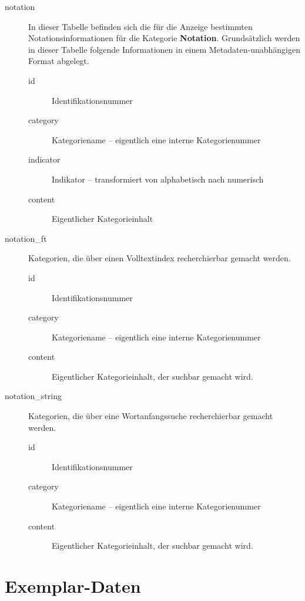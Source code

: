 \documentclass[11pt, twoside, a4paper, BCOR8mm, DIV12, bibtotoc,idxtotoc]{scrbook}
\begin{document}
\begin{description}
\item[notation] In dieser Tabelle befinden sich die für die Anzeige
  bestimmten Notationsinformationen für die Kategorie
  \textbf{Notation}. Grundsätzlich werden in dieser Tabelle
  folgende Informationen in einem Metadaten-unabhängigen Format
  abgelegt.
  \begin{description}
  \item[id] Identifikationsnummer
  \item[category] Kategoriename -- eigentlich eine interne Kategorienummer
  \item[indicator] Indikator -- transformiert von alphabetisch nach numerisch
  \item[content] Eigentlicher Kategorieinhalt
  \end{description}
\item[notation\_ft] Kategorien, die über einen Volltextindex recherchierbar
  gemacht werden.
  \begin{description}
  \item[id] Identifikationsnummer
  \item[category] Kategoriename -- eigentlich eine interne Kategorienummer
  \item[content] Eigentlicher Kategorieinhalt, der suchbar gemacht wird.
  \end{description}
\item[notation\_string] Kategorien, die über eine Wortanfangssuche
  recherchierbar gemacht werden.
  \begin{description}
  \item[id] Identifikationsnummer
  \item[category] Kategoriename -- eigentlich eine interne Kategorienummer
  \item[content] Eigentlicher Kategorieinhalt, der suchbar gemacht wird.
  \end{description}
\end{description}

\section{Exemplar-Daten}
\end{document}
